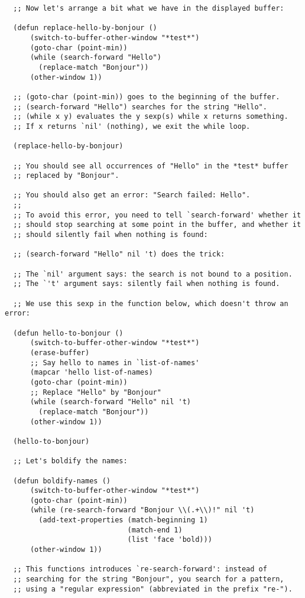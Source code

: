 \documentclass[11pt]{ctexart}
\begin{document}
{{{{\begin{lstlisting}
  ;; Now let's arrange a bit what we have in the displayed buffer:

  (defun replace-hello-by-bonjour ()
      (switch-to-buffer-other-window "*test*")
      (goto-char (point-min))
      (while (search-forward "Hello")
        (replace-match "Bonjour"))
      (other-window 1))

  ;; (goto-char (point-min)) goes to the beginning of the buffer.
  ;; (search-forward "Hello") searches for the string "Hello".
  ;; (while x y) evaluates the y sexp(s) while x returns something.
  ;; If x returns `nil' (nothing), we exit the while loop.

  (replace-hello-by-bonjour)

  ;; You should see all occurrences of "Hello" in the *test* buffer
  ;; replaced by "Bonjour".

  ;; You should also get an error: "Search failed: Hello".
  ;;
  ;; To avoid this error, you need to tell `search-forward' whether it
  ;; should stop searching at some point in the buffer, and whether it
  ;; should silently fail when nothing is found:

  ;; (search-forward "Hello" nil 't) does the trick:

  ;; The `nil' argument says: the search is not bound to a position.
  ;; The `'t' argument says: silently fail when nothing is found.

  ;; We use this sexp in the function below, which doesn't throw an error:

  (defun hello-to-bonjour ()
      (switch-to-buffer-other-window "*test*")
      (erase-buffer)
      ;; Say hello to names in `list-of-names'
      (mapcar 'hello list-of-names)
      (goto-char (point-min))
      ;; Replace "Hello" by "Bonjour"
      (while (search-forward "Hello" nil 't)
        (replace-match "Bonjour"))
      (other-window 1))

  (hello-to-bonjour)

  ;; Let's boldify the names:

  (defun boldify-names ()
      (switch-to-buffer-other-window "*test*")
      (goto-char (point-min))
      (while (re-search-forward "Bonjour \\(.+\\)!" nil 't)
        (add-text-properties (match-beginning 1)
                             (match-end 1)
                             (list 'face 'bold)))
      (other-window 1))

  ;; This functions introduces `re-search-forward': instead of
  ;; searching for the string "Bonjour", you search for a pattern,
  ;; using a "regular expression" (abbreviated in the prefix "re-").


\end{lstlisting}}}}}
\end{document}
